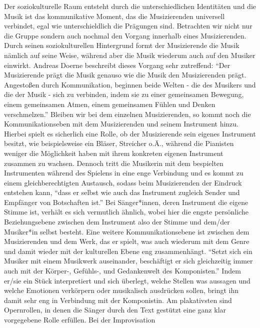 \autocite[56]{doerne:umfassend_musizieren} Der soziokulturelle Raum entsteht
durch die unterschiedlichen Identitäten und die Musik ist das kommunikative
Moment, das die Musizierenden universell verbindet, egal wie unterschieldlich
die Prägungen sind. Betrachten wir nicht nur die Gruppe sondern auch nochmal den
Vorgang innerhalb eines Musizierenden. Durch seinen soziokulturellen Hintergrund
formt der Musizierende die Musik nämlich auf seine Weise, während aber die Musik
wiederum auch auf den Musiker einwirkt. Andreas Doerne beschreibt dieses Vorgang
sehr zutreffend: \enquote{Der Musizierende prägt die Musik genauso wie die Musik den
Musizierenden prägt. Angestoßen durch Kommunikation, beginnen beide Welten - die
des Musikers und die der Musik - sich zu verbinden, indem sie zu einer
gemeinsamen Bewegung, einem gemeinsamen Atmen, einem gemeinsamen Fühlen und
Denken verschmelzen.} \autocite[60]{doerne:umfassend_musizieren} Bleiben wir bei
dem einzelnen Musizierenden, so kommt noch die Kommunikationseben mit dem
Musizierenden und seinem Instrument hinzu. Hierbei spielt es sicherlich eine
Rolle, ob der Musizierende sein eigenes Instrument besitzt, wie beispielsweise
ein Bläser, Streicher o.Ä., während die Pianisten weniger die Möglichkeit haben
mit ihrem konkreten eigenen Instrument zusammen zu wachsen. Dennoch tritt die
Musikerin mit dem bespielten Instrumenten während des Spielens in eine enge
Verbindung und es kommt zu einem gleichberechtigten Austausch, sodass
beim Musizierenden der Eindruck entstehen kann, \enquote{dass er selbst wie auch das
Instrument zugleich Sender und Empfänger von Botschaften ist.}
\autocite[59]{doerne:umfassend_musizieren} Bei Sänger*innen, deren Instrument die
eigene Stimme ist, verhält es sich vermutlich ähnlich, wobei hier die engste
persönliche Beziehungsebene zwischen dem Instrument also der Stimme und dem/der
Musiker*in selbst besteht. Eine weitere Kommunikationsebene ist zwischen
dem Musizierenden und dem Werk, das er spielt, was auch wiederum mit dem Genre
und damit wieder mit der kulturellen Ebene eng zusammenhängt. \enquote{Setzt sich ein
Musiker mit einem Musikwerk auseinander, beschäftigt er sich gleichzeitig immer
auch mit der Körper-, Gefühls-, und Gedankenwelt des Komponisten.}
\autocite[59]{doerne:umfassend_musizieren} Indem er/sie ein Stück interpretiert und
sich überlegt, welche Stellen was aussagen und welche Emotionen verkörpern oder
musikalisch ausdrücken sollen, bringt ihn damit sehr eng in Verbindung mit der
Komponistin. Am plakativsten sind Opernrollen, in denen die Sänger durch den
Text gestützt eine ganz klar vorgegebene Rolle erfüllen. Bei der Improvisation
